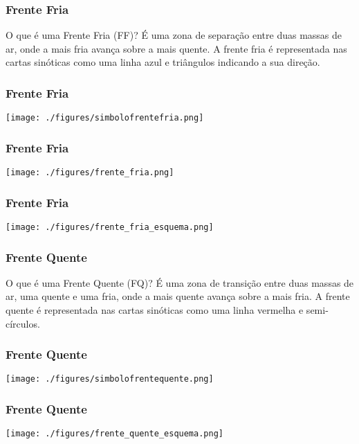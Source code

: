 \begin{frame}
\frametitle{Frente Fria}
\begin{block}{O que é uma Frente Fria (FF)?}
  É uma zona de separação entre duas massas de ar, onde a mais fria avança
  sobre a mais quente.  A frente fria é representada nas cartas sinóticas como
  uma linha azul e triângulos indicando a sua direção.
\end{block}
\end{frame}

\begin{frame}
\frametitle{Frente Fria}
  \begin{center}
    \texttt{[image: ./figures/simbolofrentefria.png]}
  \end{center}
\end{frame}

\begin{frame}
\frametitle{Frente Fria}
  \begin{center}
    \texttt{[image: ./figures/frente\_fria.png]}
  \end{center}
\end{frame}

\begin{frame}
\frametitle{Frente Fria}
  \begin{center}
    \texttt{[image: ./figures/frente\_fria\_esquema.png]}
  \end{center}
\end{frame}

\begin{frame}
\frametitle{Frente Quente}
\begin{block}{O que é uma Frente Quente (FQ)?}
  É uma zona de transição entre duas massas de ar, uma quente e uma fria, onde
  a mais quente avança sobre a mais fria.  A frente quente é representada nas
  cartas sinóticas como uma linha vermelha e semi-círculos.
\end{block}
\end{frame}

\begin{frame}
\frametitle{Frente Quente}
  \begin{center}
    \texttt{[image: ./figures/simbolofrentequente.png]}
  \end{center}
\end{frame}


\begin{frame}
\frametitle{Frente Quente}
  \begin{center}
    \texttt{[image: ./figures/frente\_quente\_esquema.png]}
  \end{center}
\end{frame}


